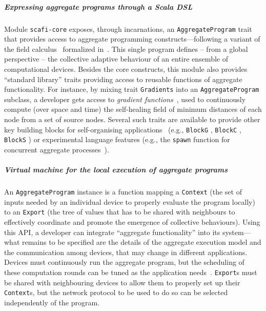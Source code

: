 \subparagraph*{Expressing aggregate programs through a Scala DSL}
\label{sec:express-programs}
%
Module \texttt{scafi-core}
 exposes,
 through incarnations,
 an \texttt{AggregateProgram} trait
  that provides access to 
  aggregate programming constructs---following 
  a variant of the field calculus~\cite{DBLP:journals/tocl/AudritoVDPB19,DBLP:journals/jlap/ViroliBDACP19}
  formalized in~\cite{DBLP:conf/isola/CasadeiVAD20}.
%
This single program defines -- from a global perspective -- 
 the collective adaptive behaviour 
 of an entire %
 ensemble of computational devices.
%
Besides the core constructs,
 this module also provides ``standard library'' traits
 providing access to reusable functions of aggregate functionality.
%
For instance, by mixing trait \texttt{Gradients}
 into an \texttt{AggregateProgram} subclass,
 a developer gets access to \emph{gradient functions}~, used to 
 continuously compute (over space and time) the self-healing field of minimum distances of each node from a set of source nodes. %
%
Several such traits are available
 to provide other key building blocks
 for self-organising applications~ (e.g., \texttt{BlockG} , \texttt{BlockC} , \texttt{BlockS} )
 or experimental language features
 (e.g., the \texttt{spawn} function for concurrent aggregate processes~).
%
\subparagraph*{Virtual machine for the local execution of aggregate programs}
%
An \texttt{AggregateProgram} instance 
 is a function
 mapping a \texttt{Context}
 (the set of inputs needed by an individual device
  to properly evaluate the program locally)
 to an \texttt{Export}
 (the tree of values that has to be shared 
  with neighbours to effectively coordinate and promote 
  the emergence of collective behaviours).
%
Using this API,
 a developer can 
 integrate ``aggregate functionality''
 into its system---what remains to be specified are the
 details of the aggregate execution model and the communication among devices,
 that may change in different applications.
%
Devices must continuously run the aggregate program,
but the scheduling of these computation rounds can be tuned
as the application needs~\cite{DBLP:journals/lmcs/PianiniCVMZ21}.
%
\texttt{Export}s must be shared with neighbouring devices to allow them
to properly set up their \texttt{Context}s,
but the network protocol to be used to do so can be selected
independently of the program.
 
